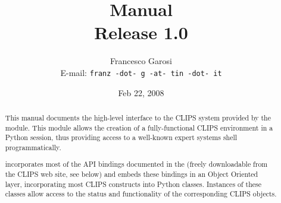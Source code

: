 \documentclass{book}
\title{
	\pyclips{} Manual\\
	{\small Release 1.0}
}
\author{%
	Francesco Garosi\\
	{\small E-mail: \texttt{franz -dot- g -at- tin -dot- it}}

}
\date{Feb 22, 2008}
\begin{document}
\maketitle




\begin{abstract}

\noindent
This manual documents the high-level interface to the CLIPS system
provided by the \pyclips{} module. This module allows the creation of a
fully-functional CLIPS environment in a Python session, thus providing
access to a well-known expert systems shell programmatically.

\pyclips{} incorporates most of the API bindings documented in the
\clipsapg{} (freely downloadable from the CLIPS web site, see below) and
embeds these bindings in an Object Oriented layer, incorporating most
CLIPS constructs into Python classes. Instances of these classes allow
access to the status and functionality of the corresponding CLIPS objects.

\end{abstract}


\begin{seealso}
\end{seealso}

\tableofcontents


\end{document}

